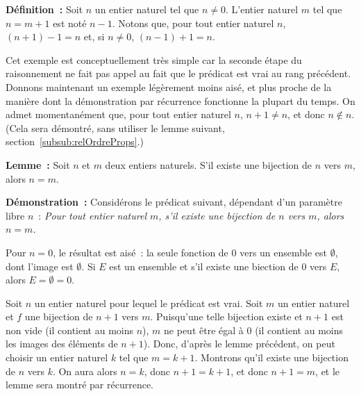    \done 

\medskip

\noindent\textbf{Définition :} Soit $n$ un entier naturel tel que $n \neq 0$. L'entier naturel $m$ tel que $n=m+1$ est noté $n-1$.
    Notons que, pour tout entier naturel $n$, $(n+1)-1 = n$ et, si $n \neq 0$, $(n-1)+1 = n$.

\medskip 

Cet exemple est conceptuellement très simple car la seconde étape du raisonnement ne fait pas appel au fait que le prédicat est vrai au rang précédent. 
Donnons maintenant un exemple légèrement moins aisé, et plus proche de la manière dont la démonstration par récurrence fonctionne la plupart du temps. 
On admet momentanément que, pour tout entier naturel $n$, $n+1 \neq n$, et donc $n \notin n$. 
(Cela sera démontré, sans utiliser le lemme suivant, section~\ref{subsub:relOrdreProps}.)

\medskip

\noindent\textbf{Lemme :} Soit $n$ et $m$ deux entiers naturels. S'il existe une bijection de $n$ vers $m$, alors $n=m$.

\medskip

\noindent\textbf{Démonstration :} Considérons le prédicat suivant, dépendant d'un paramètre libre $n$ : \textit{Pour tout entier naturel $m$, s'il existe une bijection de $n$ vers $m$, alors $n=m$.} 

    Pour $n=0$, le résultat est aisé : la seule fonction de $0$ vers un ensemble est $\emptyset$, dont l'image est $\emptyset$. 
    Si $E$ est un ensemble et s'il existe une biection de $0$ vers $E$, alors $E = \emptyset = 0$.

    Soit $n$ un entier naturel pour lequel le prédicat est vrai. 
    Soit $m$ un entier naturel et $f$ une bijection de $n+1$ vers $m$. 
    Puisqu'une telle bijection existe et $n+1$ est non vide (il contient au moins $n$), $m$ ne peut être égal à $0$ (il contient au moins les images des éléments de $n+1$). 
    Donc, d'après le lemme précédent, on peut choisir un entier naturel $k$ tel que $m = k+1$. 
    Montrons qu'il existe une bijection de $n$ vers $k$. 
    On aura alors $n=k$, donc $n+1=k+1$, et donc $n+1=m$, et le lemme sera montré par récurrence.

